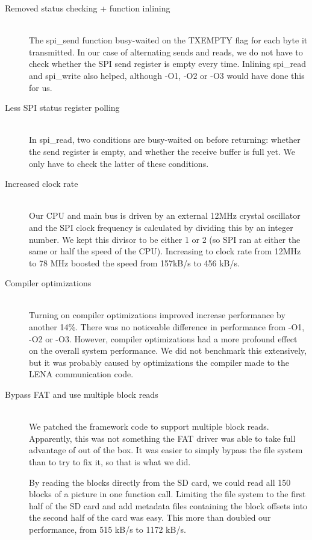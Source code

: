 \begin{description}
	\item[Removed status checking + function inlining] \hfill \\
		The spi\_send function busy-waited on the TXEMPTY flag for each
		byte it transmitted. In our case of alternating sends and reads,
		we do not have to check whether the SPI send register is empty
		every time. Inlining spi\_read and spi\_write also helped,
		although -O1, -O2 or -O3 would have done this for us.
	\item[Less SPI status register polling] \hfill \\
		In spi\_read, two conditions are busy-waited on before
		returning: whether the send register is empty, and whether the
		receive buffer is full yet. We only have to check the latter of
		these conditions.
	\item[Increased clock rate] \hfill \\
		Our CPU and main bus is driven by an external 12MHz crystal
		oscillator and the SPI clock frequency is calculated by dividing
		this by an integer number. We kept this divisor to be either 1
		or 2 (so SPI ran at either the same or half the speed of the
		CPU). Increasing to clock rate from 12MHz to 78 MHz boosted the
		speed from 157kB/s to 456 kB/s.
	\item[Compiler optimizations] \hfill \\
		Turning on compiler optimizations improved increase performance
		by another 14\%. There was no noticeable difference in
		performance from -O1, -O2 or -O3. However, compiler
		optimizations had a more profound effect on the overall system
		performance. We did not benchmark this extensively, but it was
		probably caused by optimizations the compiler made to the \ac{LENA}
		communication code.
	\item[Bypass FAT and use multiple block reads] \hfill \\
		We patched the framework code to support multiple block reads.
		Apparently, this was not something the FAT driver was able to
		take full advantage of out of the box. It was easier to simply
		bypass the file system than to try to fix it, so that is what we
		did.
		
		By reading the blocks directly from the SD card, we could read
		all 150 blocks of a picture in one function call. Limiting the
		file system to the first half of the SD card and add metadata
		files containing the block offsets into the second half of the
		card was easy. This more than doubled our performance, from 515
		kB/s to 1172 kB/s.
\end{description}

